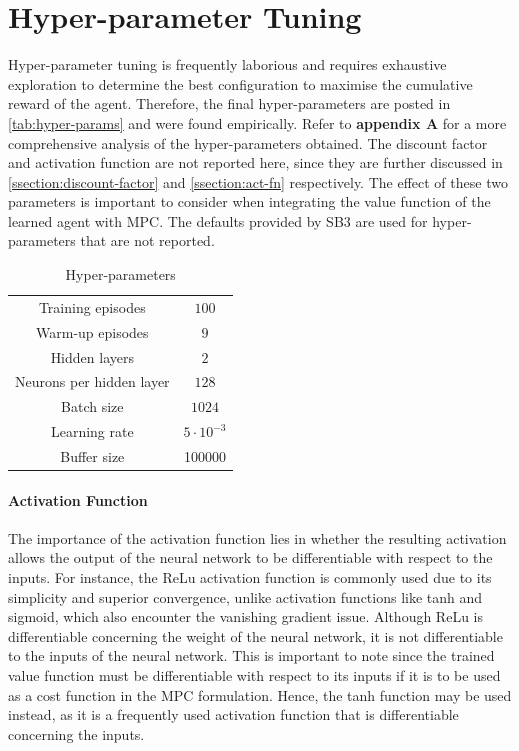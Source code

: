 \section{Hyper-parameter Tuning}
Hyper-parameter tuning is frequently laborious and requires exhaustive exploration to determine the best configuration to maximise the cumulative reward of the agent. Therefore, the final hyper-parameters are posted in \autoref{tab:hyper-params} and were found empirically. Refer to \textbf{appendix A} for a more comprehensive analysis of the hyper-parameters obtained. The discount factor and activation function are not reported here, since they are further discussed in \autoref{ssection:discount-factor} and \autoref{ssection:act-fn} respectively. The effect of these two parameters is important to consider when integrating the value function of the learned agent with MPC. The defaults provided by SB3 are used for hyper-parameters that are not reported.

\begin{table}[H]
    \centering
    \begin{tabular}{|c|c|}
    \hline
        Training episodes & $100$  \\
        Warm-up episodes &  $9$\\
        Hidden layers & $2$ \\
        Neurons per hidden layer& $128$ \\
        Batch size & $1024$ \\
        Learning rate & $5\cdot 10^{-3}$ \\
        Buffer size & 100000 \\
        \hline
        
    \end{tabular}
    \caption{Hyper-parameters}
    \label{tab:hyper-params}
\end{table}

\paragraph{Activation Function} 
The importance of the activation function lies in whether the resulting activation allows the output of the neural network to be differentiable with respect to the inputs. For instance, the ReLu activation function is commonly used due to its simplicity and superior convergence, unlike activation functions like tanh and sigmoid, which also encounter the vanishing gradient issue. Although ReLu is differentiable concerning the weight of the neural network, it is not differentiable to the inputs of the neural network. This is important to note since the trained value function must be differentiable with respect to its inputs if it is to be used as a cost function in the MPC formulation. Hence, the tanh function may be used instead, as it is a frequently used activation function that is differentiable concerning the inputs.

